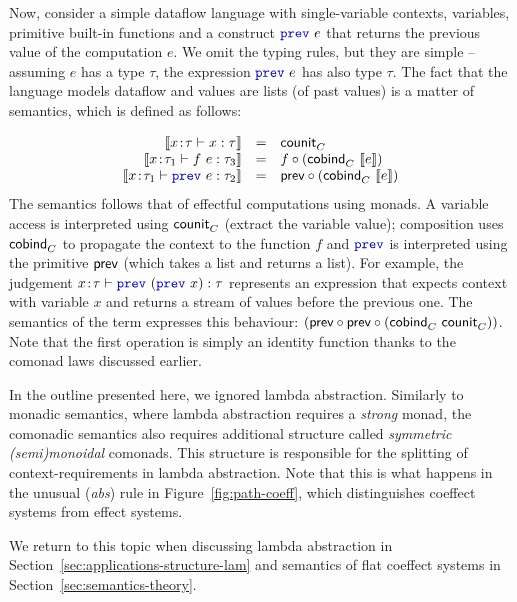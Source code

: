 Now, consider a simple dataflow language with single-variable contexts, variables,
primitive built-in functions and a construct $\kvd{prev}~e$ that returns the previous
value of the computation $e$. We omit the typing rules, but they are simple -- assuming $e$
has a type $\tau$, the expression $\kvd{prev}~e$ has also type $\tau$. The fact that
the language models dataflow and values are lists (of past values) is a matter of semantics,
which is defined as follows:

\begin{equation*}
\begin{array}{rcl}
\sem{x\!:\!\tau \vdash x : \tau} &=& \ident{counit}_\ctyp{}{}\\
\sem{x\!:\!\tau_1 \vdash f~e : \tau_3} &=& f \circ (\ident{cobind}_\ctyp{}{} ~\sem{e})\\
\sem{x\!:\!\tau_1 \vdash \kvd{prev}~e : \tau_2} &=& \ident{prev} \circ (\ident{cobind}_\ctyp{}{} ~\sem{e})\\
\end{array}
\end{equation*}
%
The semantics follows that of effectful computations using monads. A variable access is interpreted
using $\textnormal{\sffamily counit}_C^{}$ (extract the variable value); composition
uses $\textnormal{\sffamily cobind}_C^{}$ to propagate the context to the function $f$ and $\kvd{prev}$
is interpreted using the primitive $\textnormal{\sffamily prev}$ (which takes a list and returns a list).
For example, the judgement $x\!:\!\tau \vdash \kvd{prev}~(\kvd{prev}~x) : \tau$ represents an
expression that expects context with variable $x$ and returns a stream of values before the
previous one. The semantics of the term expresses this behaviour:
$(\textnormal{\sffamily prev} \circ \textnormal{\sffamily prev} \circ (\textnormal{\sffamily cobind}_C^{}~\textnormal{\sffamily counit}_C^{}))$.
Note that the first operation is simply an identity function thanks to the comonad laws discussed
earlier.

In the outline presented here, we ignored lambda abstraction. Similarly to monadic semantics,
where lambda abstraction requires a \emph{strong} monad, the comonadic semantics also requires
additional structure called \emph{symmetric (semi)monoidal} comonads. This structure is
responsible for the splitting of context-requirements in lambda abstraction. Note that this is
what happens in the unusual (\emph{abs}) rule in Figure~\ref{fig:path-coeff}, which distinguishes
coeffect systems from effect systems.

We return to this topic when discussing lambda abstraction in Section~\ref{sec:applications-structure-lam}
and semantics of flat coeffect systems in Section~\ref{sec:semantics-theory}.

